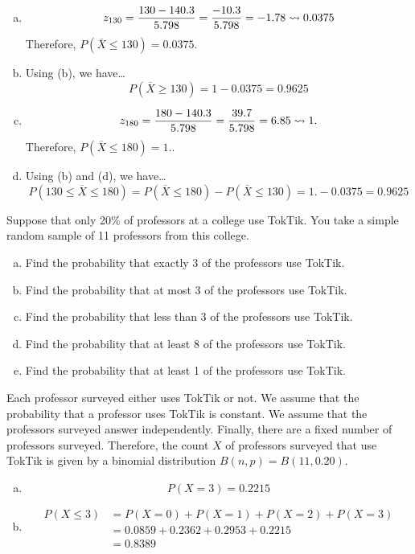 \documentclass[12pt,letterpaper]{exam}
\begin{document}
\begin{questions}
\begin{enumerate}[(a)]
\item 
	\[
	z_{130}= \dfrac{130 - 140.3}{5.798}= \dfrac{-10.3}{5.798}= -1.78 \rightsquigarrow 0.0375
	\] 
Therefore, $P(\overline{X} \leq 130)= 0.0375$. \pspace

\item Using (b), we have\dots
	\[
	P(\overline{X} \geq 130)= 1 - 0.0375= 0.9625
	\] \pspace

\item 
	\[
	z_{180}= \dfrac{180 - 140.3}{5.798}= \dfrac{39.7}{5.798}= 6.85 \rightsquigarrow 1.
	\]
Therefore, $P(\overline{X} \leq 180)= 1.$. \pspace

\item Using (b) and (d), we have\dots
	\[
	P(130 \leq \overline{X} \leq 180)= P(\overline{X} \leq 180) - P(\overline{X} \leq 130)= 1. - 0.0375= 0.9625
	\]
\end{enumerate}



\newpage
\question[10] Suppose that only 20\% of professors at a college use TokTik. You take a simple random sample of 11 professors from this college.
	\begin{enumerate}[(a)]
	\item Find the probability that exactly 3 of the professors use TokTik.
	\item Find the probability that at most 3 of the professors use TokTik.
	\item Find the probability that less than 3 of the professors use TokTik.
	\item Find the probability that at least 8 of the professors use TokTik.
	\item Find the probability that at least 1 of the professors use TokTik.
	\end{enumerate} \pspace

\sol Each professor surveyed either uses TokTik or not. We assume that the probability that a professor uses TokTik is constant. We assume that the professors surveyed answer independently. Finally, there are a fixed number of professors surveyed. Therefore, the count $X$ of professors surveyed that use TokTik is given by a binomial distribution $B(n, p)= B(11, 0.20)$.

\begin{enumerate}[(a)]
\item 
	\[
	P(X= 3)= 0.2215
	\] \pspace

\item 
	\[
	\begin{aligned}
	P(X \leq 3)&= P(X= 0) + P(X= 1) + P(X= 2) + P(X = 3) \\[0.3cm]
	&= 0.0859 + 0.2362 + 0.2953 + 0.2215 \\[0.3cm]
	&= 0.8389
	\end{aligned}
	\] \pspace


\end{enumerate}
\end{questions}
\end{document}
